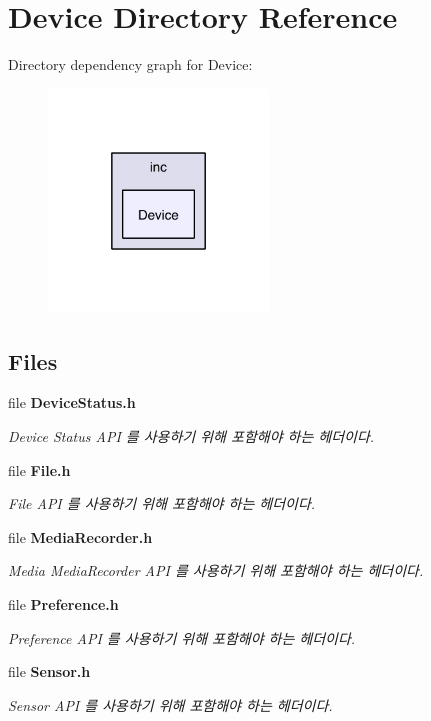 \section{Device Directory Reference}
\label{dir_a0c8867dd1d16fcf077501a0ef1cd801}
Directory dependency graph for Device\-:\nopagebreak
\begin{figure}[H]
\begin{center}
\leavevmode
\includegraphics[width=166pt]{dir_a0c8867dd1d16fcf077501a0ef1cd801_dep}
\end{center}
\end{figure}
\subsection*{Files}
\begin{DoxyCompactItemize}
\item 
file {\bf Device\-Status.\-h}
\begin{DoxyCompactList}\small\item\em Device Status A\-P\-I 를 사용하기 위해 포함해야 하는 헤더이다. \end{DoxyCompactList}\item 
file {\bf File.\-h}
\begin{DoxyCompactList}\small\item\em File A\-P\-I 를 사용하기 위해 포함해야 하는 헤더이다. \end{DoxyCompactList}\item 
file {\bf Media\-Recorder.\-h}
\begin{DoxyCompactList}\small\item\em Media Media\-Recorder A\-P\-I 를 사용하기 위해 포함해야 하는 헤더이다. \end{DoxyCompactList}\item 
file {\bf Preference.\-h}
\begin{DoxyCompactList}\small\item\em Preference A\-P\-I 를 사용하기 위해 포함해야 하는 헤더이다. \end{DoxyCompactList}\item 
file {\bf Sensor.\-h}
\begin{DoxyCompactList}\small\item\em Sensor A\-P\-I 를 사용하기 위해 포함해야 하는 헤더이다. \end{DoxyCompactList}\end{DoxyCompactItemize}
